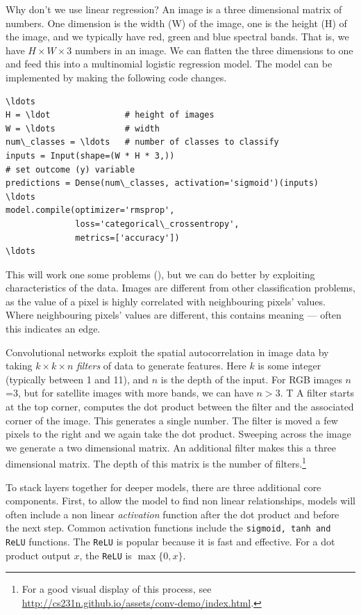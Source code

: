 \documentclass[12pt, a4paper, oneside, headinclude, footinclude]{article}
\begin{document}
Why don't we use linear regression?  An image is a three dimensional matrix of
numbers. One dimension is the width (W) of the image, one is the height (H) of
the image, and we typically have red, green and blue spectral bands. That is,
we have $H\times W \times 3$ numbers in an image. We can flatten the three
dimensions to one and feed this into a multinomial logistic regression model.
The model can be implemented by making the following code changes.

\begin{verbatim}
\ldots
H = \ldot               # height of images
W = \ldots              # width
num\_classes = \ldots   # number of classes to classify  
inputs = Input(shape=(W * H * 3,))
# set outcome (y) variable
predictions = Dense(num\_classes, activation='sigmoid')(inputs)
\ldots
model.compile(optimizer='rmsprop', 
              loss='categorical\_crossentropy', 
              metrics=['accuracy'])
\ldots
\end{verbatim}

This will work one some problems (), but we can do better by exploiting
characteristics of the data. Images are different from other classification
problems, as the value of a pixel is highly correlated with neighbouring
pixels' values. Where neighbouring pixels' values are different, this contains
meaning --- often this indicates an edge.

Convolutional networks exploit the spatial autocorrelation in image data by
taking $k\times k \times n$ \textit{filters} of data to generate features.
Here $k$ is some integer (typically between 1 and 11), and $n$ is the depth of
the input.  For RGB images $n$=3, but for satellite images with more bands, we
can have $n>3$. 
T
A filter starts at the top corner, computes the dot product between the filter
and the associated corner of the image. This generates a single number. The
filter is moved a few pixels to the right and we again take the dot product.
Sweeping across the image we generate a two dimensional matrix. An additional
filter makes this a three dimensional matrix. The depth of this matrix is the
number of filters.\footnote{For a good visual display of this process, see
\url{http://cs231n.github.io/assets/conv-demo/index.html}.}

To stack layers together for deeper models, there are three  additional core
components. First, to allow the model to find non linear relationships, models
will often include a non linear \textit{activation} function after the dot
product and before the next step. Common activation functions include the
\texttt{sigmoid, tanh and ReLU} functions. The \texttt{ReLU} is popular
because it is fast and effective. For a dot product output $x$, the
\texttt{ReLU} is $\max\{0, x\}$. 
\end{document}
